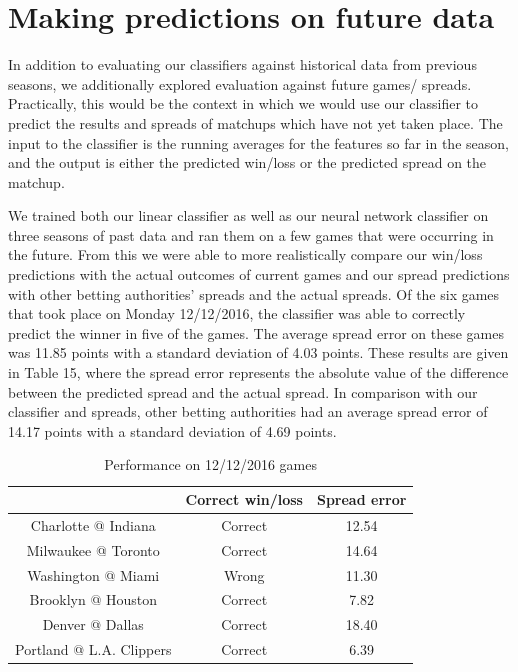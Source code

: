 \documentclass{article}
\begin{document}
\section{Making predictions on future data}
In addition to evaluating our classifiers against historical data from previous seasons, we additionally explored evaluation against future games/ spreads. Practically, this would be the context in which we would use our classifier to predict the results and spreads of matchups which have not yet taken place. The input to the classifier is the running averages for the features so far in the season, and the output is either the predicted win/loss or the predicted spread on the matchup.

We trained both our linear classifier as well as our neural network classifier on three seasons of past data and ran them on a few games that were occurring in the future. From this we were able to more realistically compare our win/loss predictions with the actual outcomes of current games and our spread predictions with other betting authorities' spreads and the actual spreads. Of the six games that took place on Monday 12/12/2016, the classifier was able to correctly predict the winner in five of the games. The average spread error on these games was 11.85 points with a standard deviation of 4.03 points. These results are given in Table 15, where the spread error represents the absolute value of the difference between the predicted spread and the actual spread. In comparison with our classifier and spreads, other betting authorities had an average spread error of 14.17 points with a standard deviation of 4.69 points.

\begin{table}
  \begin{center}
    \begin{tabular}{ | c | c | c | }
      \hline
                                & Correct win/loss     & Spread error  \\ \hline
      Charlotte @ Indiana       & Correct              & 12.54    \\ \hline
      Milwaukee @ Toronto       & Correct              & 14.64    \\ \hline
      Washington @ Miami        & Wrong                & 11.30     \\ \hline
      Brooklyn @ Houston        & Correct              & 7.82      \\ \hline
      Denver @ Dallas           & Correct              & 18.40    \\ \hline
      Portland @ L.A. Clippers  & Correct              & 6.39    \\ \hline
    \end{tabular}
  \end{center}
  \caption{Performance on 12/12/2016 games}
\end{table}
\end{document}
